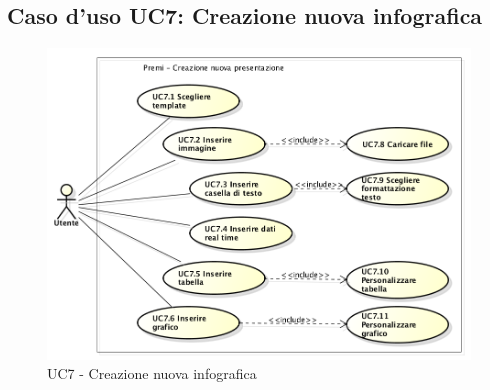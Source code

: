 \subsection{Caso d'uso UC7: Creazione nuova infografica}
\begin{figure}[h] 
	\centering 
	\includegraphics[scale=0.45] {img/UC7.png} 
	\caption{UC7 - Creazione nuova infografica} 
\end{figure}

